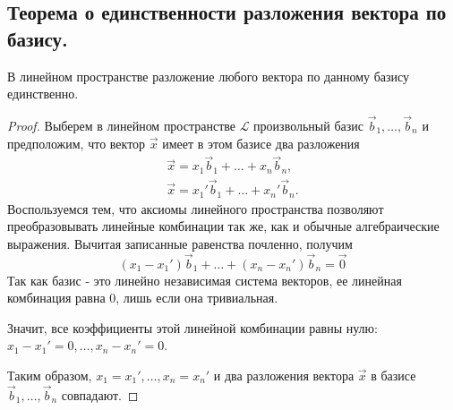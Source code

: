\subsection{
    Теорема о единственности разложения вектора по базису.
}

\begin{theorem}
    В линейном пространстве разложение любого вектора по данному базису единственно.
    \label{thm:theorem_2_3}
\end{theorem}

\begin{proof}
    Выберем в линейном пространстве $\mathcal{L}$ произвольный базис $\vec{b}_1, \ldots, \vec{b}_n$ и предположим, что вектор $\vec{x}$ имеет в этом базисе два разложения
    \begin{align*}
        \vec{x} = x_1\vec{b}_1 + \ldots + x_n\vec{b}_n,\\
        \vec{x} = x_1'\vec{b}_1 + \ldots + x_n'\vec{b}_n.
    \end{align*}
    Воспользуемся тем, что аксиомы линейного пространства позволяют преобразовывать линейные комбинации так же, как и обычные алгебраические выражения. Вычитая записанные равенства почленно, получим
    $$(x_1 - x_1')\vec{b}_1 + \ldots + (x_n - x_n')\vec{b}_n = \vec{0}$$
    Так как базис - это линейно независимая система векторов, ее линейная комбинация равна $0$, лишь если она тривиальная.
    
    Значит, все коэффициенты этой линейной комбинации равны нулю: $x_1 - x_1' = 0, \ldots, x_n - x_n' = 0$. 
    
    Таким образом, $x_1 = x_1', \ldots, x_n = x_n'$ и два разложения вектора $\vec{x}$ в базисе $\vec{b}_1, \ldots, \vec{b}_n$ совпадают.
\end{proof}
